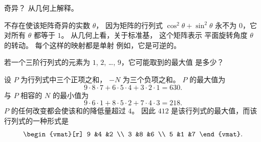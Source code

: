 \begin{exercises}
\begin{equation*}
    \end{equation*}
    奇异？
    从几何上解释。
    \begin{answer}
      不存在使该矩阵奇异的实数 \( \theta \)，
      因为矩阵的行列式
      \( \cos^2\theta+\sin^2\theta \) 永不为 $0$，它对所有 $\theta$
      都等于 $1$。
      从几何上看，关于标准基，
      这个矩阵表示
      平面旋转角度 \( \theta \) 的转动。
      每个这样的映射都是单射 \Dash  例如，它是可逆的。  
    \end{answer}
  \puzzle \item  
    \cite{Monthly55p257}
    若一个三阶行列式的元素为
    \( 1 \), \( 2 \), \ldots, \( 9 \)，它可能取到的最大值
    是多少？
    \begin{answer}
      \answerasgiven
      设 \( P \) 为行列式中三个正项之和，
      \( -N \) 为三个负项之和。
      \( P \) 的最大值为
      \begin{equation*}
        9\cdot 8\cdot 7 +6\cdot 5\cdot 4 +3\cdot 2\cdot 1=630.
      \end{equation*}
      与 \( P \) 相容的 \( N \) 的最小值为
      \begin{equation*}
        9\cdot 6\cdot 1 +8\cdot 5\cdot 2 +7\cdot 4\cdot 3=218.
      \end{equation*}
      \( P \) 的任何改变都会使该和的降低量超过
      \( 4 \)。
      因此 \( 412 \) 是该行列式的最大值，而该行列式的一种形式是
      \begin{equation*}
         \begin{vmat}[r]
            9  &4  &2  \\
            3  &8  &6  \\
            5  &1  &7
         \end{vmat}.
      \end{equation*}  
    \end{answer}
\end{exercises}
